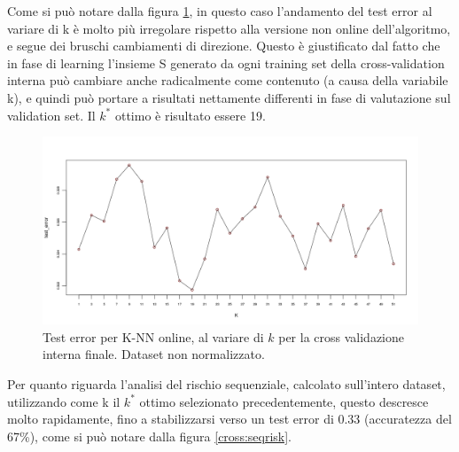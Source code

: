 \documentclass[fleqn,10pt]{SelfArx} %
\begin{document}
Come si può notare dalla figura \ref{cross:final3}, in questo caso l'andamento del test error al variare di k è molto più irregolare rispetto alla versione non online dell'algoritmo, e segue dei bruschi cambiamenti di direzione. Questo è giustificato dal fatto che in fase di learning l'insieme S generato da ogni training set della cross-validation interna può cambiare anche radicalmente come contenuto (a causa della variabile k), e quindi può portare a risultati nettamente differenti in fase di valutazione sul validation set. Il $k^{*}$ ottimo è risultato essere 19.

\begin{figure}
\includegraphics[scale=0.27]{knn_online_wo_norm/final_seq.png}
\caption{\footnotesize{Test error per K-NN online, al variare di $k$ per la cross validazione interna finale. Dataset non normalizzato.}}
\label{cross:final3}
\end{figure}

Per quanto riguarda l'analisi del rischio sequenziale, calcolato sull'intero dataset, utilizzando come k il $k^{*}$ ottimo selezionato precedentemente, questo descresce molto rapidamente, fino a stabilizzarsi verso un test error di 0.33 (accuratezza del 67\%), come si può notare dalla figura \ref{cross:seqrisk}.
\end{document}

